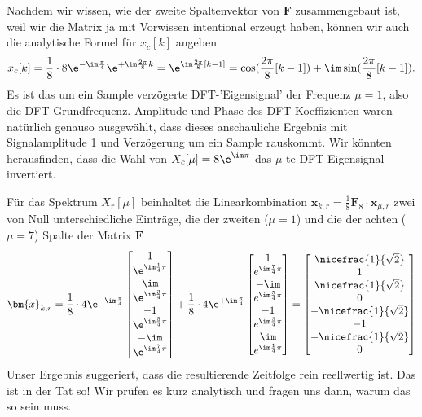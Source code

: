 \begin{ExCalc}
%
Nachdem wir wissen, wie der zweite Spaltenvektor von $\bm{F}$ zusammengebaut
ist, weil wir die Matrix ja mit Vorwissen intentional erzeugt haben, können wir
auch die analytische Formel für $x_c[k]$ angeben
\begin{align}
x_c[k] = \frac{1}{8} \cdot 8 \e^{-\im\frac{\pi}{4}} \e^{+\im\frac{2\pi}{8} k}=
\e^{\im \frac{2\pi}{8} [k -1] } =
\cos(\frac{2\pi}{8} [k-1]) + \im \sin(\frac{2\pi}{8} [k-1]).
\end{align}
Es ist das um ein Sample verzögerte DFT-'Eigensignal' der Frequenz $\mu=1$, also
die DFT Grundfrequenz. Amplitude und Phase des DFT Koeffizienten waren
natürlich genauso ausgewählt, dass dieses anschauliche Ergebnis mit
Signalamplitude 1 und Verzögerung um ein Sample rauskommt. Wir könnten
herausfinden, dass die Wahl von $X_c[\mu] = 8\e^{\im\pi}$ das $\mu$-te DFT Eigensignal
invertiert.

Für das Spektrum $X_r[\mu]$ beinhaltet die Linearkombination $\bm{x}_{k,r}  =
\frac{1}{8} \bm{F}_8 \cdot \bm{x}_{\mu,r}$ zwei von Null unterschiedliche
Einträge, die der zweiten ($\mu=1$) und die der achten ($\mu=7$)
Spalte der Matrix $\bm{F}$
\begin{align}
\bm{x}_{k,r} = \frac{1}{8} \cdot 4 \e^{-\im\frac{\pi}{4}}
\begin{bmatrix}
1 \\  \e^{\im\frac{1}{4}\pi} \\ \im \\ \e^{\im\frac{3}{4}\pi}  \\ -1 \\ \e^{\im\frac{5}{4}\pi} \\ -\im \\ \e^{\im\frac{7}{4}\pi}
\end{bmatrix}
+
\frac{1}{8} \cdot 4 \e^{+\im\frac{\pi}{4}}
\begin{bmatrix}
1 \\ e^{\im\frac{7}{4}\pi} \\ -\im \\ e^{\im\frac{5}{4}\pi} \\ -1 \\ e^{\im\frac{3}{4}\pi} \\ \im \\ e^{\im\frac{1}{4}\pi}
\end{bmatrix}
=
\begin{bmatrix}
\nicefrac{1}{\sqrt{2}}\\
1\\
\nicefrac{1}{\sqrt{2}}\\
0\\
-\nicefrac{1}{\sqrt{2}}\\
-1\\
-\nicefrac{1}{\sqrt{2}}\\
0
\end{bmatrix}
\end{align}
Unser Ergebnis suggeriert, dass die resultierende Zeitfolge rein reellwertig ist.
Das ist in der Tat so! Wir prüfen es kurz analytisch und fragen uns dann, warum
das so sein muss.


\end{ExCalc}
